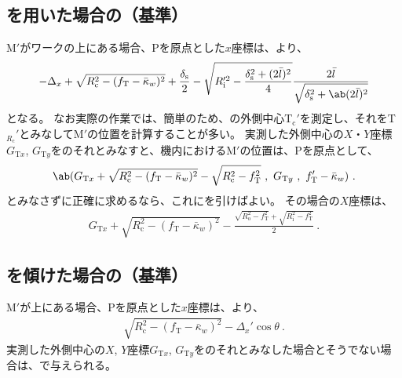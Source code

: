 \subsection{\Spacer を用いた場合の\KeywayCenter（\CurvatureCenter 基準）}
\KeywayCenter M$'$がワークの\CenterCurvatureLine 上にある場合、\TableCenter Pを原点とした$x$座標は、より、
\begin{align*}
  -\Delta_x+\sqrt{R_\mathrm c^2-(f_\mathrm T-\bar\kappa_w)^2}+\frac{\delta_\mathrm s}2
  -\sqrt{R_\mathrm i'^2-\frac{\delta_\mathrm s^2+(2\bar l)^2}4}\frac{2\bar l}{\sqrt{\delta_\mathrm s^2+\ab(2\bar l)^2}}
\end{align*}
となる。
なお実際の作業では、簡単のため、\TopEndFace の外側中心T$_\mathrm c'$を測定し、それを\TopCurvatureCenter T$_{R_\mathrm c}'$とみなして\KeywayCenter M$'$の位置を計算することが多い。
実測した外側中心の$X$・$Y$座標$G_{\mathrm Tx}$, $G_{\mathrm Ty}$を\TopCurvatureCenter のそれとみなすと、機内における\KeywayCenter M$'$の位置は、\TableCenter Pを原点として、
\begin{align*}
  \ab(
    G_{\mathrm Tx}
    +\sqrt{R_\mathrm c^2-(f_\mathrm T-\bar\kappa_w)^2}
    -\sqrt{R_\mathrm c^2-f_\mathrm T^2}\ ,\
    G_{\mathrm Ty}~,~
    f_\mathrm T'-\bar\kappa_w
  )\ .
\end{align*}
\TopCurvatureCenter とみなさずに正確に求めるなら、これにを引けばよい。
その場合の$X$座標は、
\begin{align}
  \label{eq:Mreal}
  G_{\mathrm Tx}
  +\sqrt{R_\mathrm c^2-(f_\mathrm T-\bar\kappa_w)^2}
  -\frac{\sqrt{R_\mathrm o^2-f_\mathrm T^2}+\sqrt{R_\mathrm i^2-f_\mathrm T^2}}2\ .
\end{align}


\subsection{\Table を傾けた場合の\KeywayCenter（\CurvatureCenter 基準）}
\KeywayCenter M$'$が\CenterCurvatureLine 上にある場合、\TableCenter Pを原点とした$x$座標は、より、
\begin{align*}
  \sqrt{R_\mathrm c^2-(f_\mathrm T-\bar\kappa_w)^2}
  -\Delta_x'\cos\theta\ .
\end{align*}
実測した外側中心の$X$, $Y$座標$G_{\mathrm Tx}$, $G_{\mathrm Ty}$を\TopCurvatureCenter のそれとみなした場合とそうでない場合は、で与えられる。



